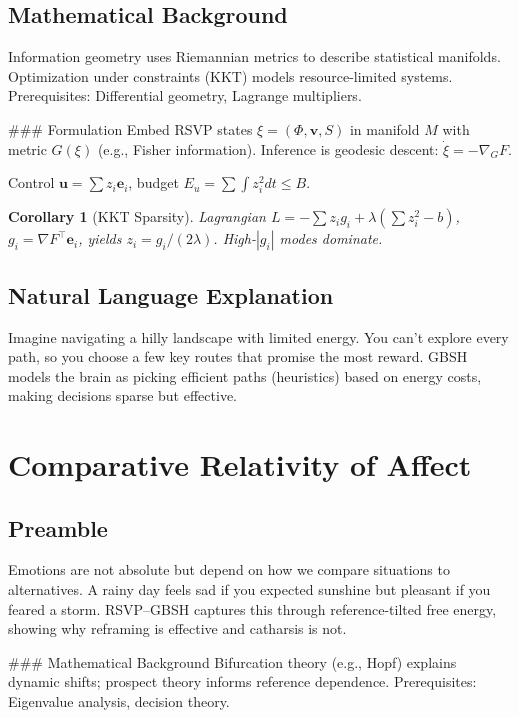 \documentclass[11pt]{article}
\theoremstyle{plain}
\newtheorem{corollary}{Corollary}
\begin{document}
\subsection{Mathematical Background}
Information geometry uses Riemannian metrics to describe statistical manifolds. Optimization under constraints (KKT) models resource-limited systems. Prerequisites: Differential geometry, Lagrange multipliers.

### Formulation
Embed RSVP states \(\xi = (\Phi, \mathbf{v}, S)\) in manifold \(M\) with metric \(G(\xi)\) (e.g., Fisher information). Inference is geodesic descent: \(\dot{\xi} = -\nabla_G F\).

Control \(\mathbf{u} = \sum z_i \mathbf{e}_i\), budget \(E_u = \sum \int z_i^2 dt \leq B\).

\begin{corollary}[KKT Sparsity]
Lagrangian \(L = -\sum z_i g_i + \lambda (\sum z_i^2 - b)\), \(g_i = \nabla F^\top \mathbf{e}_i\), yields \(z_i = g_i / (2\lambda)\). High-\(|g_i|\) modes dominate.
\end{corollary}

\subsection{Natural Language Explanation}
Imagine navigating a hilly landscape with limited energy. You can’t explore every path, so you choose a few key routes that promise the most reward. GBSH models the brain as picking efficient paths (heuristics) based on energy costs, making decisions sparse but effective.

\section{Comparative Relativity of Affect}

\subsection{Preamble}
Emotions are not absolute but depend on how we compare situations to alternatives. A rainy day feels sad if you expected sunshine but pleasant if you feared a storm. RSVP–GBSH captures this through reference-tilted free energy, showing why reframing is effective and catharsis is not.

### Mathematical Background
Bifurcation theory (e.g., Hopf) explains dynamic shifts; prospect theory informs reference dependence. Prerequisites: Eigenvalue analysis, decision theory.
\end{document}
